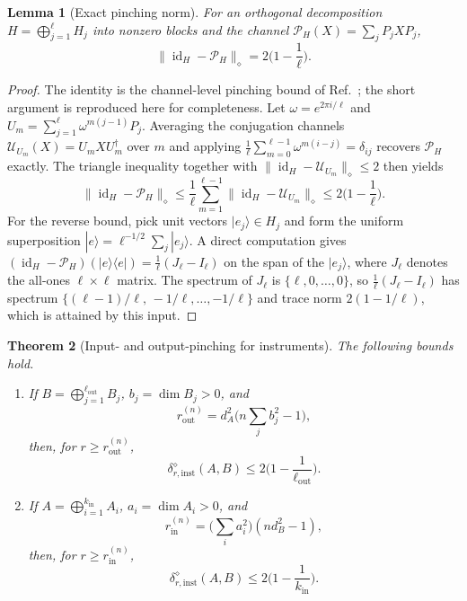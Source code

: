 \documentclass[11pt,a4paper]{article}
\newtheorem{theorem}{Theorem}[section]
\newtheorem{lemma}[theorem]{Lemma}
\newcommand{\id}{\operatorname{id}}
\begin{document}
\begin{lemma}[Exact pinching norm]
\label{lem:pinching-norm}
For an orthogonal decomposition $H=\bigoplus_{j=1}^{\ell}H_j$ into nonzero blocks and the channel $\mathcal P_H(X)=\sum_jP_jXP_j$,
\[
\|\id_H-\mathcal P_H\|_\diamond=2\Big(1-\frac1\ell\Big).
\]
\end{lemma}

\begin{proof}
The identity is the channel-level pinching bound of Ref.~\cite{CompanionChannels}; the short argument is reproduced here for completeness. Let $\omega=e^{2\pi i/\ell}$ and $U_m=\sum_{j=1}^{\ell}\omega^{m(j-1)}P_j$. Averaging the conjugation channels $\mathcal U_{U_m}(X)=U_mXU_m^\dagger$ over $m$ and applying $\frac1\ell\sum_{m=0}^{\ell-1}\omega^{m(i-j)}=\delta_{ij}$ recovers $\mathcal P_H$ exactly. The triangle inequality together with $\|\id_H-\mathcal U_{U_m}\|_\diamond\le2$ then yields
\[
\|\id_H-\mathcal P_H\|_\diamond
\le\frac1\ell\sum_{m=1}^{\ell-1}\|\id_H-\mathcal U_{U_m}\|_\diamond
\le2\Big(1-\frac1\ell\Big).
\]
For the reverse bound, pick unit vectors $|e_j\rangle\in H_j$ and form the uniform superposition $|e\rangle=\ell^{-1/2}\sum_j|e_j\rangle$. A direct computation gives $(\id_H-\mathcal P_H)(|e\rangle\langle e|)=\frac1\ell(J_\ell-I_\ell)$ on the span of the $|e_j\rangle$, where $J_\ell$ denotes the all-ones $\ell\times\ell$ matrix. The spectrum of $J_\ell$ is $\{\ell,0,\dots,0\}$, so $\frac1\ell(J_\ell-I_\ell)$ has spectrum $\{(\ell-1)/\ell,\,-1/\ell,\dots,-1/\ell\}$ and trace norm $2(1-1/\ell)$, which is attained by this input.
\end{proof}

\begin{theorem}[Input- and output-pinching for instruments]
\label{thm:pinching}
The following bounds hold.
\begin{enumerate}[leftmargin=*,itemsep=2pt]
\item If $B=\bigoplus_{j=1}^{\ell_{\mathrm{out}}}B_j$, $b_j=\dim B_j>0$, and
\[
r_{\mathrm{out}}^{(n)}=d_A^2\Big(n\sum_jb_j^2-1\Big),
\]
then, for $r\ge r_{\mathrm{out}}^{(n)}$,
\[
\delta_{r,\mathrm{inst}}^{\diamond}(A,B)\le2\Big(1-\frac1{\ell_{\mathrm{out}}}\Big).
\]
\item If $A=\bigoplus_{i=1}^{k_{\mathrm{in}}}A_i$, $a_i=\dim A_i>0$, and
\[
r_{\mathrm{in}}^{(n)}=\Big(\sum_ia_i^2\Big)(nd_B^2-1),
\]
then, for $r\ge r_{\mathrm{in}}^{(n)}$,
\[
\delta_{r,\mathrm{inst}}^{\diamond}(A,B)\le2\Big(1-\frac1{k_{\mathrm{in}}}\Big).
\]
\end{enumerate}
\end{theorem}
\end{document}

